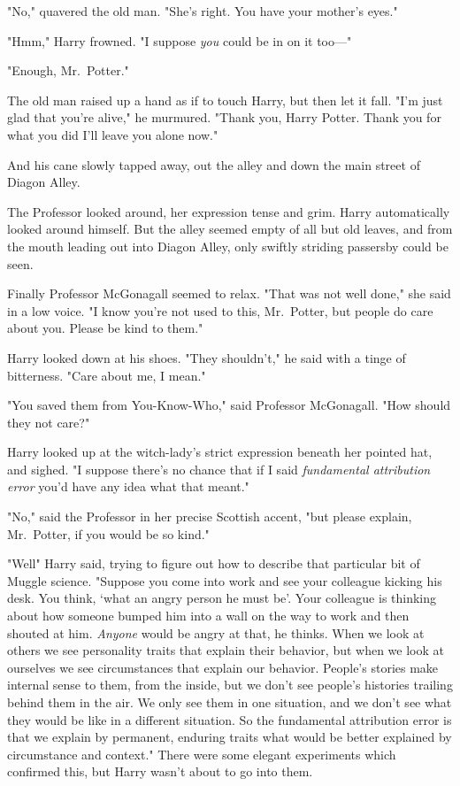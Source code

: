 "No," quavered the old man. "She's right. You have your mother's eyes."

"Hmm," Harry frowned. "I suppose \emph{you} could be in on it too\mbox{---}"

"Enough, Mr.~Potter."

The old man raised up a hand as if to touch Harry, but then let it fall. "I'm
just glad that you're alive," he murmured. "Thank you, Harry Potter. Thank you
for what you did{\el} I'll leave you alone now."

And his cane slowly tapped away, out the alley and down the main street of
Diagon Alley.

The Professor looked around, her expression tense and grim. Harry automatically
looked around himself. But the alley seemed empty of all but old leaves, and
from the mouth leading out into Diagon Alley, only swiftly striding passersby
could be seen.

Finally Professor McGonagall seemed to relax. "That was not well done," she
said in a low voice. "I know you're not used to this, Mr.~Potter, but people do
care about you. Please be kind to them."

Harry looked down at his shoes. "They shouldn't," he said with a tinge of
bitterness. "Care about me, I mean."

"You saved them from You-Know-Who," said Professor McGonagall. "How should they
not care?"

Harry looked up at the witch-lady's strict expression beneath her pointed hat,
and sighed. "I suppose there's no chance that if I said \emph{fundamental
attribution error} you'd have any idea what that meant."

"No," said the Professor in her precise Scottish accent, "but please explain,
Mr.~Potter, if you would be so kind."

"Well{\el}" Harry said, trying to figure out how to describe that particular
bit of Muggle science. "Suppose you come into work and see your colleague
kicking his desk. You think, `what an angry person he must be'. Your colleague
is thinking about how someone bumped him into a wall on the way to work and
then shouted at him. \emph{Anyone} would be angry at that, he thinks. When we
look at others we see personality traits that explain their behavior, but when
we look at ourselves we see circumstances that explain our behavior. People's
stories make internal sense to them, from the inside, but we don't see people's
histories trailing behind them in the air. We only see them in one situation,
and we don't see what they would be like in a different situation. So the
fundamental attribution error is that we explain by permanent, enduring traits
what would be better explained by circumstance and context." There were some
elegant experiments which confirmed this, but Harry wasn't about to go into
them.

